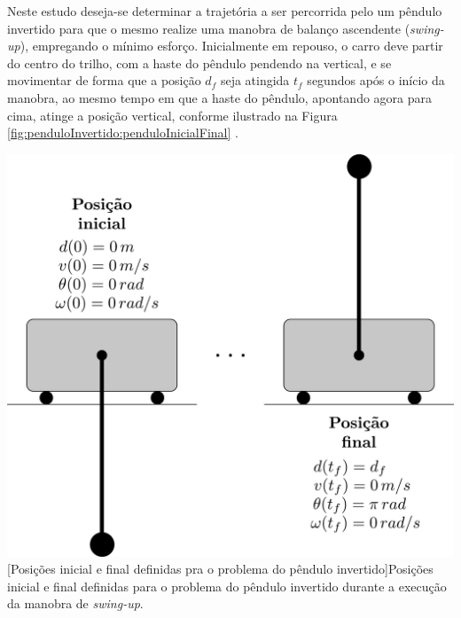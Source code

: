 Neste estudo deseja-se determinar a trajetória a ser percorrida pelo um pêndulo invertido para que o mesmo realize uma manobra de balanço ascendente (\textit{swing-up}), empregando o mínimo esforço. Inicialmente em repouso, o carro deve partir do centro do trilho, com a haste do pêndulo pendendo na vertical, e se movimentar de forma que a posição $ d_f $ seja atingida $ t_f $ segundos após o início da manobra, ao mesmo tempo em que a haste do pêndulo, apontando agora para cima, atinge a posição vertical, conforme ilustrado na Figura \ref{fig:penduloInvertido:penduloInicialFinal} \cite{kelly_introduction_2017}. 

\noindent	
\begin{minipage}{\textwidth}
	\vspace{\onelineskip}
	\centering
	\includegraphics[scale=0.3]{draw/resultados/pdf/penduloInicialFinal}
	[Posições inicial e final definidas pra o problema do pêndulo invertido]{Posições inicial e final definidas para o problema do pêndulo invertido durante a execução da manobra de \textit{swing-up}.}
	\label{fig:penduloInvertido:penduloInicialFinal}
	\vspace{\onelineskip}
\end{minipage}


